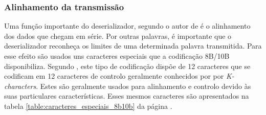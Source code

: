 \subsubsection*{Alinhamento da transmissão} \label{subsub:alinhamento}
Uma função importante do deserializador, segundo o autor de \cite{R032} é o alinhamento dos dados que chegam em série. Por outras palavras, é importante que o deserializador reconheça os limites de uma determinada palavra transmitida. Para esse efeito são usados uns caracteres especiais que a codificação 8B/10B disponibiliza. Segundo \cite{R032}, este tipo de codificação dispõe de 12 caracteres que se codificam em 12 caracteres de controlo geralmente conhecidos por por \textit{K-characters}. Estes são geralmente usados para alinhamento e controlo devido às suas particulares características. Esses mesmos caracteres são apresentados na tabela \ref{table:caracteres_especiais_8b10b} da página \pageref{table:caracteres_especiais_8b10b}.

